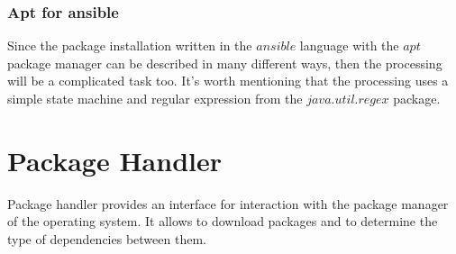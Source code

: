 \subsubsection*{Apt for ansible}
Since the package installation written in the $ansible$ language with the $apt$ package manager can be described in many different ways, then the processing will be a complicated task too.
It's worth mentioning that the processing uses a simple state machine and regular expression from the $java$.$util$.$regex$ package.

\section{Package Handler}
Package handler provides an interface for interaction with the package manager of the operating system.
It allows to download packages and to determine the type of dependencies between them.

